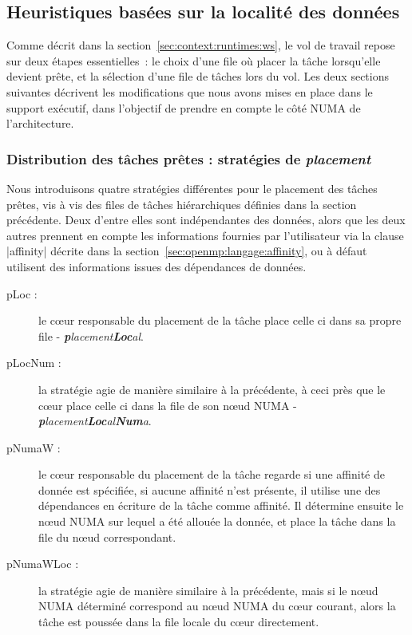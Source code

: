 \subsection{Heuristiques basées sur la localité des données}\label{sec:contrib:ws:heuristics}

Comme décrit dans la section~\ref{sec:context:runtimes:ws}, le vol de travail repose sur deux étapes essentielles~: le choix d'une file où placer la tâche lorsqu'elle devient prête, et la sélection d'une file de tâches lors du vol.
Les deux sections suivantes décrivent les modifications que nous avons mises en place dans le support exécutif, dans l'objectif de prendre en compte le côté NUMA de l'architecture.


\subsubsection{Distribution des tâches prêtes : stratégies de \emph{placement}}
\label{sec:openmp:runtime:push}

Nous introduisons quatre stratégies différentes pour le placement des tâches prêtes, vis à vis des files de tâches hiérarchiques définies dans la section précédente.
Deux d'entre elles sont indépendantes des données, alors que les deux autres prennent en compte les informations fournies par l'utilisateur via la clause |affinity| décrite dans la section~\ref{sec:openmp:langage:affinity}, ou à défaut utilisent des informations issues des dépendances de données.

\begin{description}
  \item [pLoc :] le cœur responsable du placement de la tâche place celle ci dans sa propre file - \emph{\textbf{p}lacement\textbf{Loc}al}.
  \item [pLocNum :] la stratégie agie de manière similaire à la précédente, à ceci près que le cœur place celle ci dans la file de son nœud NUMA - \emph{\textbf{p}lacement\textbf{Loc}al\textbf{Num}a}.
  \item [pNumaW :] le cœur responsable du placement de la tâche regarde si une affinité de donnée est spécifiée, si aucune affinité n'est présente, il utilise une des dépendances en écriture de la tâche comme affinité.
Il détermine ensuite le nœud NUMA sur lequel a été allouée la donnée, et place la tâche dans la file du nœud correspondant.
  \item [pNumaWLoc :] la stratégie agie de manière similaire à la précédente, mais si le nœud NUMA déterminé correspond au nœud NUMA du cœur courant, alors la tâche est poussée dans la file locale du cœur directement.
\end{description}

